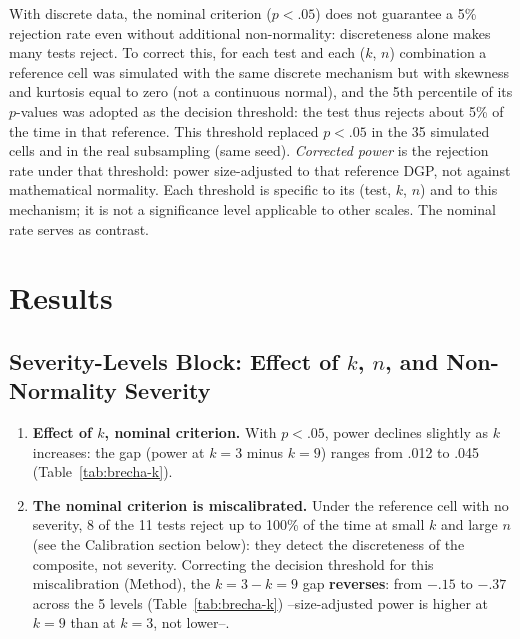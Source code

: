 \documentclass[man,mask,donotrepeattitle,floatsintext]{apa7}
\begin{document}
With discrete data, the nominal criterion ($p<.05$) does not guarantee a 5\% rejection rate even without additional non-normality: discreteness alone makes many tests reject. To correct this, for each test and each ($k$, $n$) combination a reference cell was simulated with the same discrete mechanism but with skewness and kurtosis equal to zero (not a continuous normal), and the 5th percentile of its $p$-values was adopted as the decision threshold: the test thus rejects about 5\% of the time in that reference. This threshold replaced $p<.05$ in the 35 simulated cells and in the real subsampling (same seed). \emph{Corrected power} is the rejection rate under that threshold: power size-adjusted to that reference DGP, not against mathematical normality. Each threshold is specific to its (test, $k$, $n$) and to this mechanism; it is not a significance level applicable to other scales. The nominal rate serves as contrast.

\section{Results}
\label{sec:results}

\subsection{Severity-Levels Block: Effect of \texorpdfstring{$k$}{k}, \texorpdfstring{$n$}{n}, and Non-Normality Severity}
\label{sec:res-niveles}

\begin{enumerate}
\item \textbf{Effect of $k$, nominal criterion.} With $p<.05$, power declines slightly as $k$ increases: the gap (power at $k=3$ minus $k=9$) ranges from .012 to .045 (Table~\ref{tab:brecha-k}).
\item \textbf{The nominal criterion is miscalibrated.} Under the reference cell with no severity, 8 of the 11 tests reject up to 100\% of the time at small $k$ and large $n$ (see the Calibration section below): they detect the discreteness of the composite, not severity. Correcting the decision threshold for this miscalibration (Method), the $k=3-k=9$ gap \textbf{reverses}: from $-.15$ to $-.37$ across the 5 levels (Table~\ref{tab:brecha-k}) --size-adjusted power is higher at $k=9$ than at $k=3$, not lower--.
\end{enumerate}
\end{document}

